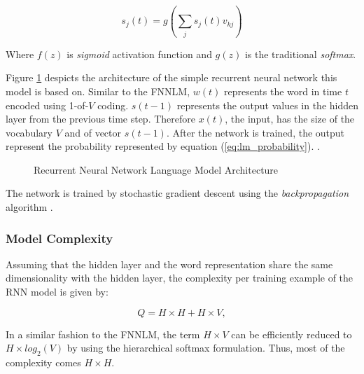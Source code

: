 \begin{equation} s_j(t) = g \left( \sum_{j}{s_j(t)v_{kj}}
  \right)   \end{equation}


Where   $f(z)$ is \textit{sigmoid} activation function and $g(z)$  is the
traditional   \textit{softmax}. 

Figure \ref{fig:RNNLM_architecture} despicts the architecture of the simple
recurrent neural network this model is based on. Similar to the \ac{FNNLM},    $w(t)$ represents the word in time $t$ encoded using 1-of-$V$ coding.  $s(t-1)$ represents the output values in the
hidden layer from the previous time step. Therefore $x(t)$, the input, has
the size of the vocabulary $V$ and of vector $s(t-1)$. After the network is
trained, the output represent the probability represented by equation (\ref{eq:lm_probability}).  \cite{mikolovphd2012}.

\begin{figure}[hptb!]
    \centering
    \caption{Recurrent Neural Network Language Model Architecture}
    \label{fig:RNNLM_architecture}
\end{figure}

The network is trained by  stochastic gradient descent using the
\textit{backpropagation} algorithm \cite{Bishop:1995:NNP:525960}.


\subsubsection{Model Complexity}
\label{sec:sub:sub:mikolov_rnnlm_complexity}

Assuming that the hidden layer and the word representation share the same
dimensionality with the hidden layer, the complexity per training example of the RNN model is
given by:


\begin{equation} Q = H \times H + H \times V,   \end{equation}

In a similar fashion to the \ac{FNNLM}, the term $H \times V$ can be
efficiently reduced to $H \times log_2(V)$ by using the hierarchical softmax
formulation. Thus, most of the complexity comes $H \times H$.





